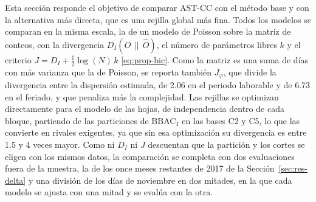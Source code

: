 Esta sección responde el objetivo de comparar AST-CC con el método base y con la
alternativa más directa, que es una rejilla global más fina. Todos los modelos se
comparan en la misma escala, la de un modelo de Poisson sobre la matriz de
conteos, con la divergencia $D_I(O \,\|\, \hat O)$, el número de parámetros
libres $k$ y el criterio $J = D_I + \tfrac{1}{2}\log(N)\,k$
\eqref{eq:prop-bic}. Como la matriz es una suma de días con más varianza que la
de Poisson, se reporta también $J_\varphi$, que divide la divergencia entre la
dispersión estimada, de 2.06 en el periodo laborable y de 6.73 en el feriado, y que
penaliza más la complejidad. Las rejillas se optimizan directamente para el modelo
de las hojas, de independencia dentro de cada bloque, partiendo de las
particiones de BBAC$_I$ en las bases C2 y C5, lo que las convierte en rivales
exigentes, ya que sin esa optimización su divergencia es entre 1.5 y 4 veces
mayor. Como ni $D_I$ ni $J$ descuentan que la partición y los cortes se eligen con
los mismos datos, la comparación se completa con dos evaluaciones fuera de la
muestra, la de los once meses restantes de 2017 de la
Sección~\ref{sec:res-delta} y una división de los días de noviembre en dos
mitades, en la que cada modelo se ajusta con una mitad y se evalúa con la otra.

